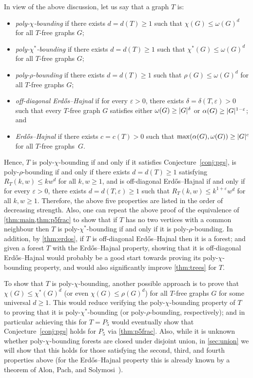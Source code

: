 \documentclass[11pt,reqno]{amsart}
\newcommand{\eps}{\varepsilon}
\newcommand{\erh}{Erd\H{o}s--Hajnal}
\newcommand{\chis}{\chi^*}
\DeclarePairedDelimiter\abs{\lvert}{\rvert}%
\begin{document}
	In view of the above discussion, let us say that a graph $T$ is:
	\begin{itemize}
		\item {\em poly-$\chi$-bounding} if there exists $d=d(T)\ge1$ such that $\chi(G)\le\omega(G)^d$ for all $T$-free graphs $G$;
		
		\item {\em poly-$\chis$-bounding} if there exists $d=d(T)\ge1$ such that $\chis(G)\le\omega(G)^d$ for all $T$-free graphs $G$;
		
		\item {\em poly-$\rho$-bounding} if there exists $d=d(T)\ge1$ such that $\rho(G)\le\omega(G)^d$ for all $T$-free graphs $G$;
		
		\item {\em off-diagonal \erh{}} if for every $\eps>0$, there exists $\delta=\delta(T,\eps)>0$ such that every $T$-free graph $G$ satisfies either $\omega(G)\ge\abs G^\delta$ or $\alpha(G)\ge\abs G^{1-\eps}$; and
		
		\item {\em \erh{}} if there exists $c=c(T)>0$ such that $\max(\alpha(G),\omega(G))\ge\abs G^c$ for all $T$-free graphs~$G$.
	\end{itemize}
	
	Hence, $T$ is poly-$\chi$-bounding if and only if it satisfies Conjecture~\ref{conj:pgs}, is poly-$\rho$-bounding if and only if there exists $d=d(T)\ge1$ satisfying $R_T(k,w)\le kw^d$ for all $k,w\ge1$, and  is off-diagonal \erh{} if and only if for every $\eps>0$, there exists $d=d(T,\eps)\ge1$ such that $R_T(k,w)\le k^{1+\eps}w^d$ for all $k,w\ge1$.
	Therefore, the above five properties are listed in the order of decreasing strength.
	Also, one can repeat the above proof of the equivalence of \cref{thm:main,thm:p5frac} to show that if $T$ has no two vertices with a common neighbour then $T$ is poly-$\chis$-bounding if and only if it is poly-$\rho$-bounding.
	In addition, by \cref{thm:erdos}, if $T$ is off-diagonal \erh{} then it is a forest; and given a forest $T$ with the \erh{} property, showing that it is off-diagonal \erh{} would probably be a good start towards proving its poly-$\chi$-bounding property, and would also significantly improve \cref{thm:trees} for $T$.
	
	To show that $T$ is poly-$\chi$-bounding, another possible approach is to prove that $\chi(G)\le \chis(G)^d$ (or even $\chi(G)\le\rho(G)^d$) for all $T$-free graphs $G$ for some universal $d\ge1$.
	This would reduce verifying the poly-$\chi$-bounding property of $T$ to proving that it is poly-$\chis$-bounding (or poly-$\rho$-bounding, respectively);
	and in particular achieving this for $T=P_5$ would eventually show that Conjecture~\ref{conj:pgs} holds for $P_5$ via \cref{thm:p5frac}.
	Also, while it is unknown whether poly-$\chi$-bounding forests are closed under disjoint union,
	in \cref{sec:union} we will show that this holds for those satisfying the second, third, and fourth properties above
	(for the \erh{} property this is already known by a theorem of Alon, Pach, and Solymosi~\cite{MR1832443}).
	
\end{document}
